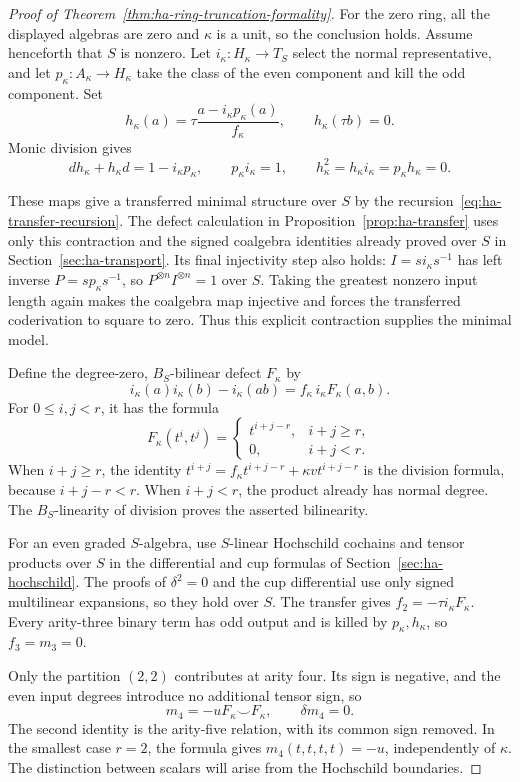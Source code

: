 \begin{proof}[Proof of Theorem~\ref{thm:ha-ring-truncation-formality}]
For the zero ring, all the displayed algebras are zero and $\kappa$
is a unit, so the conclusion holds.
Assume henceforth that $S$ is nonzero.
Let $i_\kappa:H_\kappa\to T_S$ select the normal representative,
and let $p_\kappa:A_\kappa\to H_\kappa$ take the class of the
even component and kill the odd component.
Set
\[
 h_\kappa(a)=\tau\frac{a-i_\kappa p_\kappa(a)}{f_\kappa},
 \qquad h_\kappa(\tau b)=0.
\]
Monic division gives
\[
 dh_\kappa+h_\kappa d=1-i_\kappa p_\kappa,\qquad
 p_\kappa i_\kappa=1,\qquad
 h_\kappa^2=h_\kappa i_\kappa=p_\kappa h_\kappa=0.
\]

These maps give a transferred minimal structure over $S$ by the
recursion~\eqref{eq:ha-transfer-recursion}.
The defect calculation in Proposition~\ref{prop:ha-transfer} uses
only this contraction and the signed coalgebra identities already
proved over $S$ in Section~\ref{sec:ha-transport}.
Its final injectivity step also holds: $I=si_\kappa s^{-1}$ has
left inverse $P=sp_\kappa s^{-1}$, so
$P^{\otimes n}I^{\otimes n}=1$ over $S$.
Taking the greatest nonzero input length again makes the coalgebra
map injective and forces the transferred coderivation to square to zero.
Thus this explicit contraction supplies the minimal model.

Define the degree-zero, $B_S$-bilinear defect $F_\kappa$ by
\[
 i_\kappa(a)i_\kappa(b)-i_\kappa(ab)
 =f_\kappa\,i_\kappa F_\kappa(a,b).
\]
For $0\leq i,j<r$, it has the formula
\[
 F_\kappa(t^i,t^j)=
 \begin{cases}
 t^{i+j-r},&i+j\geq r,\\
 0,&i+j<r.
 \end{cases}
\]
When $i+j\geq r$, the identity
$t^{i+j}=f_\kappa t^{i+j-r}+\kappa vt^{i+j-r}$ is the division
formula, because $i+j-r<r$.
When $i+j<r$, the product already has normal degree.
The $B_S$-linearity of division proves the asserted bilinearity.

For an even graded $S$-algebra, use $S$-linear Hochschild cochains
and tensor products over $S$ in the differential and cup formulas
of Section~\ref{sec:ha-hochschild}.
The proofs of $\delta^2=0$ and the cup differential use only signed
multilinear expansions, so they hold over $S$.
The transfer gives $f_2=-\tau i_\kappa F_\kappa$.
Every arity-three binary term has odd output and is killed by
$p_\kappa,h_\kappa$, so $f_3=m_3=0$.

Only the partition $(2,2)$ contributes at arity four.
Its sign is negative, and the even input degrees introduce no
additional tensor sign, so
\[
 m_4=-uF_\kappa\smile F_\kappa,\qquad \delta m_4=0.
\]
The second identity is the arity-five relation, with its common
sign removed.
In the smallest case $r=2$, the formula gives
$m_4(t,t,t,t)=-u$, independently of $\kappa$.
The distinction between scalars will arise from the Hochschild boundaries.


\end{proof}

